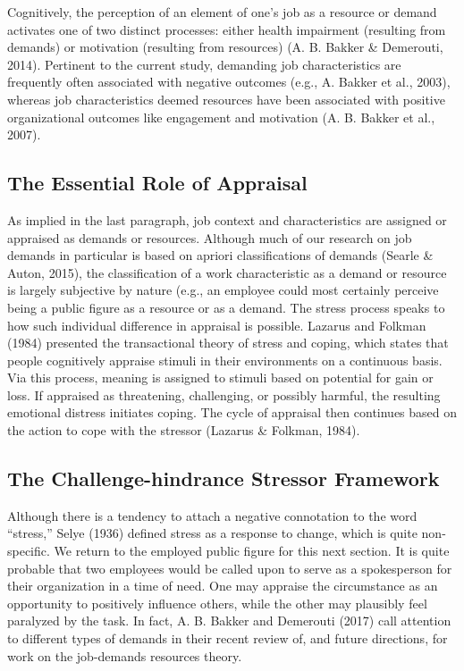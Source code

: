 \documentclass[
  english,
  man]{apa6}
\begin{document}
Cognitively, the perception of an element of one's job as a resource or demand activates one of two distinct processes: either health impairment (resulting from demands) or motivation (resulting from resources) (A. B. Bakker \& Demerouti, 2014). Pertinent to the current study, demanding job characteristics are frequently often associated with negative outcomes (e.g., A. Bakker et al., 2003), whereas job characteristics deemed resources have been associated with positive organizational outcomes like engagement and motivation (A. B. Bakker et al., 2007).

\hypertarget{the-essential-role-of-appraisal}{%
\subsection{The Essential Role of Appraisal}\label{the-essential-role-of-appraisal}}

As implied in the last paragraph, job context and characteristics are assigned or appraised as demands or resources. Although much of our research on job demands in particular is based on apriori classifications of demands (Searle \& Auton, 2015), the classification of a work characteristic as a demand or resource is largely subjective by nature (e.g., an employee could most certainly perceive being a public figure as a resource or as a demand. The stress process speaks to how such individual difference in appraisal is possible. Lazarus and Folkman (1984) presented the transactional theory of stress and coping, which states that people cognitively appraise stimuli in their environments on a continuous basis. Via this process, meaning is assigned to stimuli based on potential for gain or loss. If appraised as threatening, challenging, or possibly harmful, the resulting emotional distress initiates coping. The cycle of appraisal then continues based on the action to cope with the stressor (Lazarus \& Folkman, 1984).

\hypertarget{the-challenge-hindrance-stressor-framework}{%
\subsection{The Challenge-hindrance Stressor Framework}\label{the-challenge-hindrance-stressor-framework}}

Although there is a tendency to attach a negative connotation to the word ``stress,'' Selye (1936) defined stress as a response to change, which is quite non-specific. We return to the employed public figure for this next section. It is quite probable that two employees would be called upon to serve as a spokesperson for their organization in a time of need. One may appraise the circumstance as an opportunity to positively influence others, while the other may plausibly feel paralyzed by the task. In fact, A. B. Bakker and Demerouti (2017) call attention to different types of demands in their recent review of, and future directions, for work on the job-demands resources theory.
\end{document}
